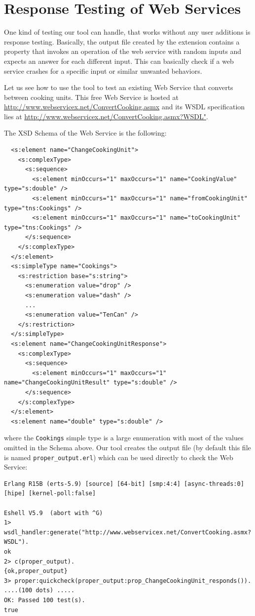 \documentclass[submission,copyright]{eptcs}
\begin{document}
\section{Response Testing of Web Services} \label{sec:response_testing}

One kind of testing our tool can handle, that works without any user additions is response testing. Basically, 
the output file created by the extension contains a property that invokes an operation of the 
web service with random inputs and expects an answer for each different input. This can basically 
check if a web service crashes for a specific input or similar unwanted behaviors. 

Let us see how to use the tool to test an existing Web Service that
converts between cooking units. This free Web Service is hosted at
\url{http://www.webservicex.net/ConvertCooking.asmx} and its WSDL
specification lies at
\url{http://www.webservicex.net/ConvertCooking.asmx?WSDL"}.

The XSD Schema of the Web Service is the following:
\begin{lstlisting}
  <s:element name="ChangeCookingUnit">
    <s:complexType>
      <s:sequence>
        <s:element minOccurs="1" maxOccurs="1" name="CookingValue" type="s:double" />
        <s:element minOccurs="1" maxOccurs="1" name="fromCookingUnit" type="tns:Cookings" />
        <s:element minOccurs="1" maxOccurs="1" name="toCookingUnit" type="tns:Cookings" />
      </s:sequence>
    </s:complexType>
  </s:element>
  <s:simpleType name="Cookings">
    <s:restriction base="s:string">
      <s:enumeration value="drop" />
      <s:enumeration value="dash" />
      ...
      <s:enumeration value="TenCan" />
    </s:restriction>
  </s:simpleType>
  <s:element name="ChangeCookingUnitResponse">
    <s:complexType>
      <s:sequence>
        <s:element minOccurs="1" maxOccurs="1" name="ChangeCookingUnitResult" type="s:double" />
      </s:sequence>
    </s:complexType>
  </s:element>
  <s:element name="double" type="s:double" />
\end{lstlisting}
where the \texttt{Cookings} simple type is a large enumeration with
most of the values omitted in the Schema above. Our tool creates the
output file (by default this file is named
\texttt{proper\_output.erl}) which can be used directly to check the
Web Service:

\begin{lstlisting}
Erlang R15B (erts-5.9) [source] [64-bit] [smp:4:4] [async-threads:0] [hipe] [kernel-poll:false]

Eshell V5.9  (abort with ^G)
1> wsdl_handler:generate("http://www.webservicex.net/ConvertCooking.asmx?WSDL").
ok
2> c(proper_output).
{ok,proper_output}
3> proper:quickcheck(proper_output:prop_ChangeCookingUnit_responds()).
....(100 dots) .....
OK: Passed 100 test(s).
true
\end{lstlisting}
\end{document}

